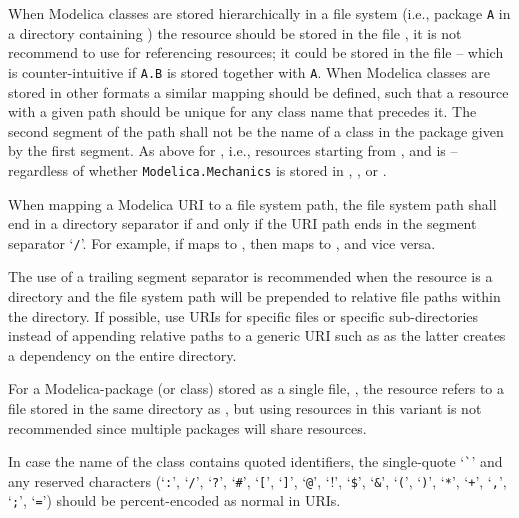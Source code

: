 When Modelica classes are stored hierarchically in a file system (i.e., package \lstinline!A! in a directory  containing ) the resource
 should be stored in the file , it is not recommend to use  for referencing resources; it could be stored in the file  -- which is counter-intuitive if \lstinline!A.B! is stored together with \lstinline!A!.
When Modelica classes are stored in other formats a similar mapping should be defined, such that a resource with a given path should be unique for any class name that precedes it.
The second segment of the path shall not be the name of a class in the package given by the first segment.
As above for , i.e., resources starting from , and  is  -- regardless of whether \lstinline!Modelica.Mechanics! is stored in , , or .

When mapping a Modelica URI to a file system path, the file system path shall end in a directory separator if and only if the URI path ends in the segment separator `\lstinline!/!'.
For example, if  maps to , then  maps to , and vice versa.

\begin{nonnormative}
The use of a trailing segment separator is recommended when the resource is a directory and the file system path will be prepended to relative file paths within the directory.
If possible, use URIs for specific files or specific sub-directories instead of appending relative paths to a generic URI such as  as the latter creates a dependency on the entire directory.
\end{nonnormative}

For a Modelica-package (or class) stored as a single file, , the resource  refers to a file  stored in the same directory as , but using resources in this variant is not recommended since multiple packages will share resources.

In case the name of the class contains quoted identifiers, the single-quote `\lstinline!`!' and any reserved characters (`\lstinline!:!', `\lstinline!/!', `\lstinline!?!', `\lstinline!#!', `\lstinline![!', `\lstinline!]!', `\lstinline!@!', `\lstinline!!!', `\lstinline[mathescape=false]!$!', `\lstinline!&!', `\lstinline!(!', `\lstinline!)!', `\lstinline!*!', `\lstinline!+!', `\lstinline!,!', `\lstinline!;!', `\lstinline!=!') should be percent-encoded as normal in URIs.

